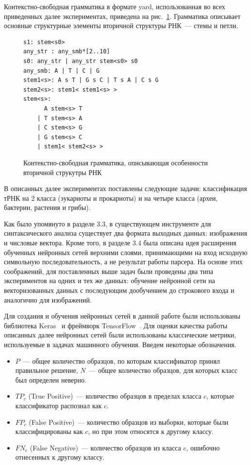Контекстно-свободная грамматика в формате yard, использованная во всех приведенных далее экспериментах, приведена на рис.~\ref{rna}. Грамматика описывает основные структурные элементы вторичной структуры РНК~--- стемы и петли.

\begin{figure} [h]
\begin{verbatim}
s1: stem<s0>
any_str : any_smb*[2..10]
s0: any_str | any_str stem<s0> s0
any_smb: A | T | C | G
stem1<s>: A s T | G s C | T s A | C s G
stem2<s>: stem1< stem1<s> >
stem<s>:
      A stem<s> T
    | T stem<s> A
    | C stem<s> G
    | G stem<s> C
    | stem1< stem2<s> >
\end{verbatim}
\caption{Контекстно-свободная грамматика, описывающая особенности вторичной струкутры РНК}
\label{rna}
\end{figure}

В описанных далее экспериментах поставлены следующие задачи: классификация тРНК на 2 класса (эукариоты и прокариоты) и на четыре класса (археи, бактерии, растения и грибы).

Как было упомянуто в разделе 3.3, в существующем инструменте для синтаксического анализа существует два формата выходных данных: изображения и числовые вектора. Кроме того, в разделе 3.4 была описана идея расширения обученных нейронных сетей верхними слоями, принимающими на вход исходную символьную последовательность, а не результат работы парсера. На основе этих соображений, для поставленных выше задач были проведены два типа экспериментов на одних и тех же данных: обучение нейронной сети на векторизованных данных с последующим дообучением до строкового входа и аналогично для изображений.


Для создания и обучения нейронных сетей в данной работе были использованы библиотека Keras~\cite{keras} и фреймворк TensorFlow~\cite{tensorflow}.
Для оценки качества работы описанных далее нейронных сетей были использованы классические метрики, используемые в задачах машинного обучения. Введем некоторые обозначения.
\begin{itemize}
    \item $P$~--- общее количество образцов, по которым классификатор принял правильное решение, $N$~--- общее количество образцов, для которых класс был определен неверно.
    \item $TP_{c}$ (True Positive)~--- количество образцов в пределах класса $c$, которые классификатор распознал как $c$.
    \item $FP_{c}$ (False Positive)~--- количество образцов из выборки, которые были классифицированы как $c$, но при этом относятся к другому классу.
    \item $FN_{c}$ (False Negative)~--- количество образцов из класса $c$, ошибочно отнесенных к другому классу.
\end{itemize}

